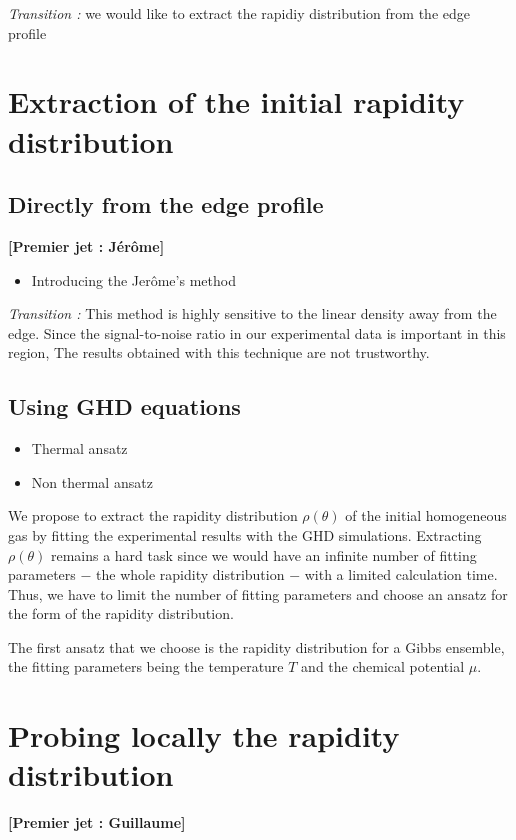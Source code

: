\documentclass[submission, Phys]{SciPost}
\begin{document}
\textit{Transition : } we would like to extract the rapidiy distribution from the edge profile


\section{Extraction of the initial rapidity distribution}

\subsection{Directly from the edge profile}
{\bf [Premier jet : Jérôme]}
\begin{itemize}
    \item Introducing the Jerôme's method
\end{itemize}

\textit{Transition :} This method is highly sensitive to the linear density away from the edge. Since the signal-to-noise ratio in our experimental data is important in this region, The results obtained with this technique are not trustworthy.

\subsection{Using GHD equations}

\begin{itemize}
    \item Thermal ansatz
    \item Non thermal ansatz
\end{itemize}

We propose to extract the rapidity distribution $\rho (\theta)$ of the initial homogeneous gas by fitting the experimental results with the GHD simulations. 
Extracting $\rho (\theta)$ remains a hard task since we would have an infinite number of fitting parameters $-$ the whole rapidity distribution $-$ with a limited calculation time.
Thus, we have to limit the number of fitting parameters and choose an ansatz for the form of the rapidity distribution.

The first ansatz that we choose is the rapidity distribution for a Gibbs ensemble, the fitting parameters being the temperature $T$ and the chemical potential $\mu$.


\section{Probing locally the rapidity distribution}
{\bf [Premier jet : Guillaume]}
\label{sec:local}
\end{document}
